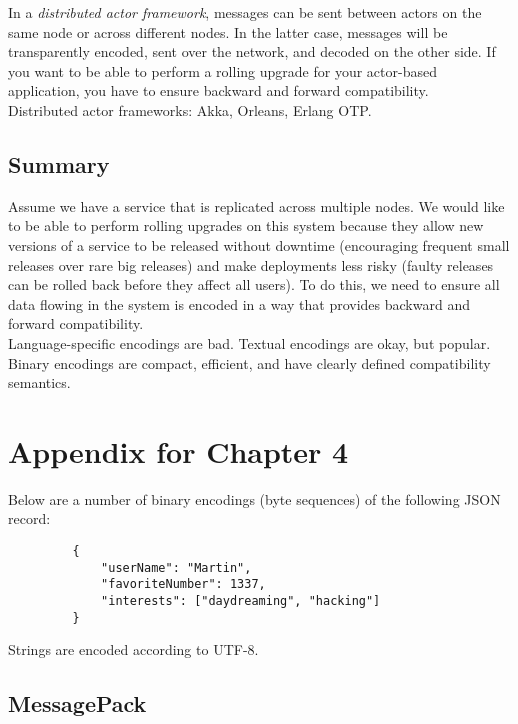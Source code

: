\documentclass[12pt, titlepage]{article}
\begin{document}
In a \textit{distributed actor framework}, messages can be sent between actors on the same node or across different nodes. In the latter case, messages will be transparently encoded, sent over the network, and decoded on the other side. If you want to be able to perform a rolling upgrade for your actor-based application, you have to ensure backward and forward compatibility. \\

Distributed actor frameworks: Akka, Orleans, Erlang OTP.

\subsection{Summary}

Assume we have a service that is replicated across multiple nodes. We would like to be able to perform rolling upgrades on this system because they allow new versions of a service to be released without downtime (encouraging frequent small releases over rare big releases) and make deployments less risky (faulty releases can be rolled back before they affect all users). To do this, we need to ensure all data flowing in the system is encoded in a way that provides backward and forward compatibility. \\

Language-specific encodings are bad. Textual encodings are okay, but popular. Binary encodings are compact, efficient, and have clearly defined compatibility semantics.

\newpage
\appendix

\section{Appendix for Chapter 4}

Below are a number of binary encodings (byte sequences) of the following JSON record:

\begin{verbatim}
         {
             "userName": "Martin",
             "favoriteNumber": 1337,
             "interests": ["daydreaming", "hacking"]
         }
\end{verbatim}

Strings are encoded according to UTF-8.

\subsection{MessagePack}
\end{document}

